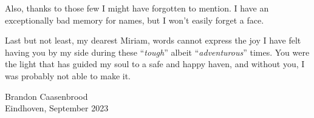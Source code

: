Also, thanks to those few I might have forgotten to mention. I have an exceptionally bad memory for names, but I won't easily forget a face.

Last but not least, my dearest Miriam, words cannot express the joy I have felt having you by my side during these ``\textit{tough}'' albeit ``\textit{adventurous}'' times. You were the light that has guided my soul to a safe and happy haven, and without you, I was probably not able to make it.

\begin{flushright}
Brandon Caasenbrood \\
Eindhoven, September 2023
\end{flushright}  